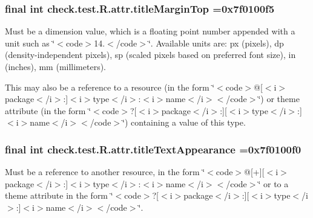 \subsubsection[{title\+Margin\+Top}]{\setlength{\rightskip}{0pt plus 5cm}final int check.\+test.\+R.\+attr.\+title\+Margin\+Top =0x7f0100f5\hspace{0.3cm}{\ttfamily [static]}}\label{classcheck_1_1test_1_1_r_1_1attr_ae16b8b538a7ee6adc4c7b58aaefb3b5c}
Must be a dimension value, which is a floating point number appended with a unit such as \char`\"{}$<$code$>$14.\+5sp$<$/code$>$\char`\"{}. Available units are\+: px (pixels), dp (density-\/independent pixels), sp (scaled pixels based on preferred font size), in (inches), mm (millimeters). 

This may also be a reference to a resource (in the form \char`\"{}$<$code$>$@\mbox{[}$<$i$>$package$<$/i$>$\+:\mbox{]}$<$i$>$type$<$/i$>$\+:$<$i$>$name$<$/i$>$$<$/code$>$\char`\"{}) or theme attribute (in the form \char`\"{}$<$code$>$?\mbox{[}$<$i$>$package$<$/i$>$\+:\mbox{]}\mbox{[}$<$i$>$type$<$/i$>$\+:\mbox{]}$<$i$>$name$<$/i$>$$<$/code$>$\char`\"{}) containing a value of this type. \hypertarget{classcheck_1_1test_1_1_r_1_1attr_a2c9b484e1413a3ab292ec0c0e06b6243}{}
\subsubsection[{title\+Text\+Appearance}]{\setlength{\rightskip}{0pt plus 5cm}final int check.\+test.\+R.\+attr.\+title\+Text\+Appearance =0x7f0100f0\hspace{0.3cm}{\ttfamily [static]}}\label{classcheck_1_1test_1_1_r_1_1attr_a2c9b484e1413a3ab292ec0c0e06b6243}
Must be a reference to another resource, in the form \char`\"{}$<$code$>$@\mbox{[}+\mbox{]}\mbox{[}$<$i$>$package$<$/i$>$\+:\mbox{]}$<$i$>$type$<$/i$>$\+:$<$i$>$name$<$/i$>$$<$/code$>$\char`\"{} or to a theme attribute in the form \char`\"{}$<$code$>$?\mbox{[}$<$i$>$package$<$/i$>$\+:\mbox{]}\mbox{[}$<$i$>$type$<$/i$>$\+:\mbox{]}$<$i$>$name$<$/i$>$$<$/code$>$\char`\"{}. \hypertarget{classcheck_1_1test_1_1_r_1_1attr_a05900c2c0b61d120064a083c8e2fcc8b}{}

